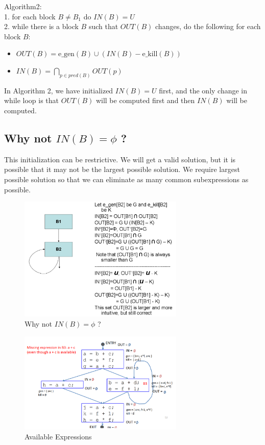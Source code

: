 \documentclass{article}
\begin{document}
Algorithm2: \\
1. for each block $B \neq B_1$ do $IN(B) = U$ \\
2. while there is a block $B$ such that $OUT(B)$ changes, do the following for each block $B$: \\

\begin{itemize}
    \item $OUT(B) = \text{e\_gen}(B) \cup (IN(B) - \text{e\_kill}(B))$
    \item $IN(B) = \bigcap_{p \in pred(B)} OUT(p)$
\end{itemize}

In Algorithm 2, we have initialized $IN(B) = U$ first, and the only change in while loop is that $OUT(B)$ will be computed first and then $IN(B)$ will be computed. \\

\subsection*{Why not $IN(B) = \phi$ ?}
This initialization can be restrictive. We will get a valid solution, but it is possible that it may not be the largest possible solution. We require largest possible solution so that we can eliminate as many common subexpressions as possible. \\

\newpage
\begin{figure}[h]
    \centering
    \includegraphics[width=0.7\textwidth]{Images/phi.png}
    \caption{Why not $IN(B) = \phi$ ?}
    \label{fig:AvailableExpressions}
\end{figure}

\begin{figure}[h]
    \centering
    \includegraphics[width=0.7\textwidth]{Images/example.png}
    \caption{Available Expressions}
    \label{fig:AvailableExpressions}
\end{figure}
\end{document}
